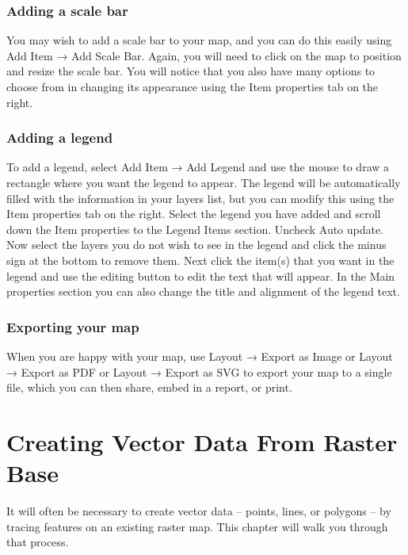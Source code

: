 \documentclass[]{book}
\begin{document}
\hypertarget{adding-a-scale-bar}{%
\subsection{Adding a scale bar}\label{adding-a-scale-bar}}

You may wish to add a scale bar to your map, and you can do this easily using Add Item → Add Scale Bar. Again, you will need to click on the map to position and resize the scale bar. You will notice that you also have many options to choose from in changing its appearance using the Item properties tab on the right.

\hypertarget{adding-a-legend}{%
\subsection{Adding a legend}\label{adding-a-legend}}

To add a legend, select Add Item → Add Legend and use the mouse to draw a rectangle where you want the legend to appear. The legend will be automatically filled with the information in your layers list, but you can modify this using the Item properties tab on the right. Select the legend you have added and scroll down the Item properties to the Legend Items section. Uncheck Auto update. Now select the layers you do not wish to see in the legend and click the minus sign at the bottom to remove them. Next click the item(s) that you want in the legend and use the editing button to edit the text that will appear. In the Main properties section you can also change the title and alignment of the legend text.

\hypertarget{exporting-your-map}{%
\subsection{Exporting your map}\label{exporting-your-map}}

When you are happy with your map, use Layout → Export as Image or Layout → Export as PDF or Layout → Export as SVG to export your map to a single file, which you can then share, embed in a report, or print.

\hypertarget{vector_from-raster}{%
\chapter{Creating Vector Data From Raster Base}\label{vector_from-raster}}

It will often be necessary to create vector data -- points, lines, or polygons -- by tracing features on an existing raster map. This chapter will walk you through that process.
\end{document}
